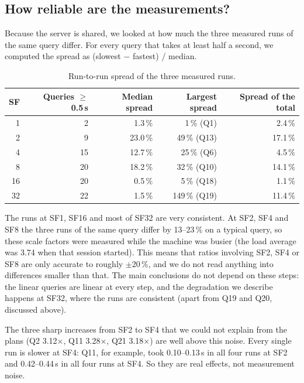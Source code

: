 \documentclass[11pt,a4paper]{article}
\begin{document}
\subsection{How reliable are the measurements?}
\label{sec:p1reliability}

Because the server is shared, we looked at how much the three measured runs
of the same query differ. For every query that takes at least half a second,
we computed the spread as (slowest $-$ fastest) / median.

\begin{table}[H]
\centering
\small
\begin{tabular}{@{}rrrrr@{}}
\toprule
SF & Queries $\geq$ 0.5\,s & Median spread & Largest spread & Spread of the total \\
\midrule
1  & 2  & 1.3\,\%  & 1\,\% (Q1)    & 2.4\,\% \\
2  & 9  & 23.0\,\% & 49\,\% (Q13)  & 17.1\,\% \\
4  & 15 & 12.7\,\% & 25\,\% (Q6)   & 4.5\,\% \\
8  & 20 & 18.2\,\% & 32\,\% (Q10)  & 14.1\,\% \\
16 & 20 & 0.5\,\%  & 5\,\% (Q18)   & 1.1\,\% \\
32 & 22 & 1.5\,\%  & 149\,\% (Q19) & 11.4\,\% \\
\bottomrule
\end{tabular}
\caption{Run-to-run spread of the three measured runs.}
\label{tab:spread}
\end{table}

The runs at SF1, SF16 and most of SF32 are very consistent. At SF2, SF4 and
SF8 the three runs of the same query differ by 13--23\,\% on a typical query,
so these scale factors were measured while the machine was busier (the load
average was 3.74 when that session started). This means that ratios involving
SF2, SF4 or SF8 are only accurate to roughly $\pm$20\,\%, and we do not read
anything into differences smaller than that. The main conclusions do not
depend on these steps: the linear queries are linear at every step, and the
degradation we describe happens at SF32, where the runs are consistent (apart
from Q19 and Q20, discussed above).

The three sharp increases from SF2 to SF4 that we could not explain from the
plans (Q2 3.12$\times$, Q11 3.28$\times$, Q21 3.18$\times$) are well above
this noise. Every single run is slower at SF4: Q11, for example, took
0.10--0.13\,s in all four runs at SF2 and 0.42--0.44\,s in all four runs at
SF4. So they are real effects, not measurement noise.
\end{document}
